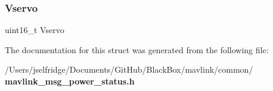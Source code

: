 \subsubsection{Vservo}
{\footnotesize\ttfamily uint16\+\_\+t Vservo}



The documentation for this struct was generated from the following file\+:\begin{DoxyCompactItemize}
\item 
/\+Users/jselfridge/\+Documents/\+Git\+Hub/\+Black\+Box/mavlink/common/\textbf{ mavlink\+\_\+msg\+\_\+power\+\_\+status.\+h}\end{DoxyCompactItemize}
